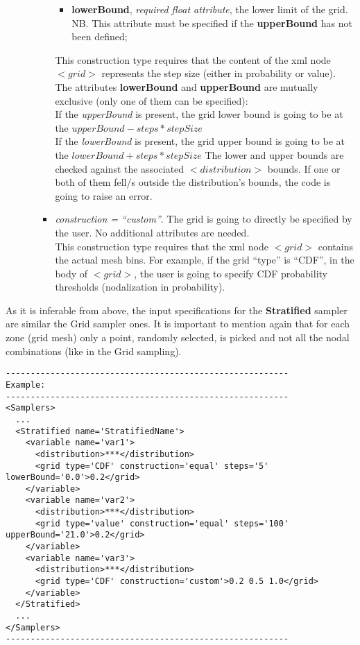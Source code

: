 \begin{itemize}
\begin{itemize}
\begin{itemize}
\begin{itemize}
         \item \textbf{lowerBound}, \textit{required float attribute}, the lower limit of the grid.
        NB. This attribute must be specified if the \textbf{upperBound} has not been defined;
      \end{itemize}
      This construction type requires that the content of the xml node $<grid>$ represents the step size (either in probability or value). The attributes \textbf{lowerBound} and \textbf{upperBound} are mutually exclusive (only one of them can be specified):
      \\ If the \textit{upperBound} is present, the grid lower bound is going to be at the $upperBound - steps*stepSize$
      \\ If the \textit{lowerBound} is present, the grid upper bound is going to be at the $lowerBound + steps*stepSize$
      The lower and upper bounds are checked against the associated $<distribution>$ bounds. If one or both of them fell/s outside the distribution's bounds, the code is going to raise an error.
  \item \textit{construction = ``custom''}. The grid is going to directly be specified by the user. No additional attributes are needed. 
     \\This construction type requires that the xml node $<grid>$  contains the actual mesh bins. For example, if the grid ``type'' is ``CDF'', in the body of $<grid>$, the user is going to specify CDF probability thresholds (nodalization in probability).
\end{itemize}
  \end{itemize}
\end{itemize}
As it is inferable from above, the input specifications for the \textbf{Stratified} sampler are similar the Grid sampler ones. It is important to mention again that for each zone (grid mesh) only a point, randomly selected, is picked and not all the nodal combinations (like in the Grid sampling).

\begin{lstlisting}[style=XML]
---------------------------------------------------------
Example:
---------------------------------------------------------
<Samplers>
  ...
  <Stratified name='StratifiedName'> 
    <variable name='var1'> 
      <distribution>***</distribution>
      <grid	type='CDF' construction='equal' steps='5' lowerBound='0.0'>0.2</grid>	
    </variable>
    <variable name='var2'> 
      <distribution>***</distribution>
      <grid	type='value' construction='equal' steps='100' upperBound='21.0'>0.2</grid>	
    </variable> 
    <variable name='var3'> 
      <distribution>***</distribution>
      <grid	type='CDF' construction='custom'>0.2 0.5 1.0</grid>	
    </variable>
  </Stratified>
  ...
</Samplers>
---------------------------------------------------------
\end{lstlisting}
 
